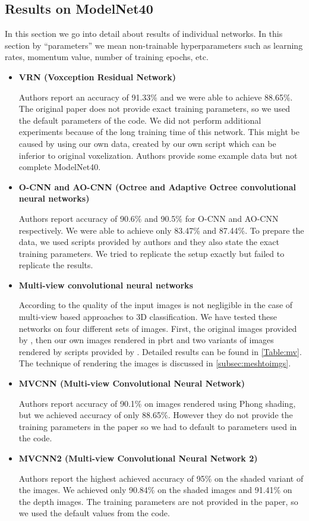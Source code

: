 \subsection{Results on ModelNet40}
In this section we go into detail about results of individual networks. In this section by “parameters” we mean non-trainable hyperparameters such as learning rates, momentum value, number of training epochs, etc.

\def\myitem #1#2{
	\item { \textbf{#1} \par #2
	}
}


\begin{itemize}
	\myitem{VRN (Voxception Residual Network)}{	Authors report an accuracy of 91.33\% and we were able to achieve 88.65\%. The original paper does not provide exact training parameters, so we used the default parameters of the code. We did not perform additional experiments because of the long training time of this network. This might be caused by using our own data, created by our own script which can be inferior to original voxelization. Authors provide some example data but not complete ModelNet40.}
	\myitem {O-CNN and AO-CNN (Octree and Adaptive Octree convolutional neural networks)}{Authors report accuracy of 90.6\% and 90.5\% for O-CNN and AO-CNN respectively. We were able to achieve only 83.47\% and 87.44\%. To prepare the data, we used scripts provided by authors and they also state the exact training parameters. We tried to replicate the setup exactly but failed to replicate the results.} 
	\myitem{Multi-view convolutional neural networks}{According to \cite{su_deeper_2018} the quality of the input images is not negligible in the case of multi-view based approaches to 3D classification. We have tested these networks on four different sets of images. First, the original images provided by \cite{su_multi-view_2015}, then our own images rendered in pbrt and two variants of images rendered by scripts provided by \cite{su_deeper_2018}.  Detailed results can be found in \autoref{Table:mv}. The technique of rendering the images is discussed in \autoref{subsec:meshtoimgs}.}
	
	\myitem{MVCNN (Multi-view Convolutional Neural Network)}{Authors report accuracy of 90.1\% on images rendered using Phong shading, but we achieved accuracy of only 88.65\%. However they do not provide the training parameters in the paper so we had to default to parameters used in the code.}
	\myitem{MVCNN2 (Multi-view Convolutional Neural Network 2)}{Authors report the highest achieved accuracy of 95\% on the shaded variant of the images. We achieved only 90.84\% on the shaded images and 91.41\% on the depth images. The training parameters are not provided in the paper, so we used the default values from the code.}

\end{itemize}
